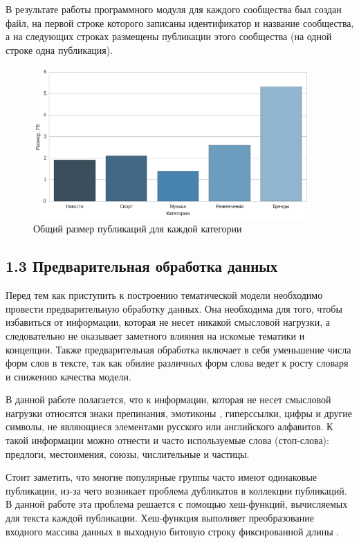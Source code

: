 \documentclass[a4paper]{report}
\begin{document}
В результате  работы программного модуля для каждого сообщества был создан файл, на первой строке которого записаны идентификатор и название сообщества, а на следующих строках размещены публикации этого сообщества (на одной строке одна публикация).

	\begin{figure}
		\centering
		\includegraphics[width=400px]
		{imgs/SizeCat.png}
		\caption{Общий размер публикаций для каждой категории}
		\label{fig:sizecat}
	\end{figure} 
	
	
	
	
	
	
	\subsection{1.3 Предварительная обработка данных}
	Перед тем как приступить к построению тематической модели необходимо провести предварительную обработку данных. 
	Она необходима для того, чтобы избавиться от информации, которая не несет никакой смысловой нагрузки, а следовательно не оказывает заметного влияния на искомые тематики и концепции. 
	Также предварительная обработка включает в себя уменьшение числа форм слов в тексте, так как обилие различных форм слова ведет к росту словаря и снижению качества модели.
	
	В данной работе полагается, что к информации, которая не несет смысловой нагрузки относятся знаки препинания, эмотиконы \cite{bib:smiley}, гиперссылки, цифры и другие символы, не являющиеся элементами русского или английского алфавитов. К такой информации можно отнести и часто используемые слова (стоп-слова): предлоги, местоимения, союзы, числительные и частицы\cite{bib:InformationRetrieval}.
	
	Стоит заметить, что многие популярные группы часто имеют одинаковые публикации, из-за чего возникает проблема дубликатов в коллекции публикаций. В данной работе эта проблема решается с помощью хеш-функций, вычисляемых для текста каждой публикации. Хеш-функция выполняет преобразование входного массива данных в выходную битовую строку фиксированной длины \cite{bib:hash}. 
	
\end{document}

